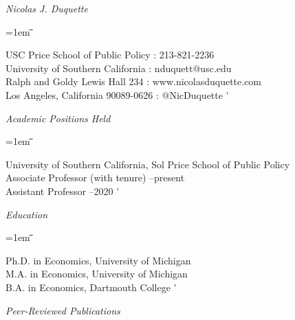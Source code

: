 \documentclass[12pt]{article}
\newcommand{\libertineSB}[1]{\textit{#1}}
\newlength{\midlength}
\newlength{\firstlength}
\newlength{\listindent}
\newcommand{\heading}[1]{
	{\setlength{\parskip}{0.8cm plus6mm minus3mm}
	\parindent=0pt
	\large \libertineSB{{#1}}}
	\vspace{0.1em}
}
\newenvironment{datetabbing}{
	\begin{tabbing}
	\parskip=1em
	\hspace*{\listindent}\=\hspace*{\firstlength}\=\hspace*{\midlength}\= \kill
}{
	\end{tabbing}
}
\begin{document}
\setlength{\parindent}{0cm}


\noindent
{\Large \libertineSB{Nicolas J. Duquette}}
\begin{datetabbing}
	USC Price School of Public Policy		\>\>\>	\faPhone: 213-821-2236						\'	\\
	University of Southern California		\>\>\>	: nduquett@usc.edu			\'	\\
	Ralph and Goldy Lewis Hall 234			\>\>\>	\faGlobe: www.nicolasduquette.com			\'	\\
	Los Angeles, California 90089-0626  		\>\>\>	\faTwitter: @NicDuquette					\'	%
\end{datetabbing}


				
\heading{Academic Positions Held}

\begin{datetabbing}
\>	University of Southern California, Sol Price School of Public Policy			\\
\>	\>	Associate Professor	(with tenure)				--present	\'	\\	%
\>	\>	Assistant Professor								--2020		\'	%
\end{datetabbing}

\heading{Education}

\begin{datetabbing}
\>	Ph.D. in Economics, University of Michigan			\>\>	2014	\' 		\\
\>	M.A. in Economics, University of Michigan			\>\>	2010	\' 		\\
\>	B.A. in Economics,	Dartmouth College				\>\>	2004	\' %
\end{datetabbing}



\heading{Peer-Reviewed Publications}
\end{document}
